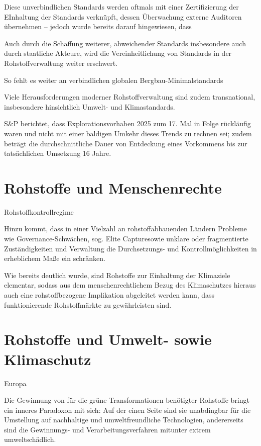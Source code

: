 \documentclass[12pt,a4paper,oneside]{book} %
\begin{document}
Diese unverbindlichen Standards werden oftmals mit einer Zertifizierung der EInhaltung der Standards verknüpft, dessen Überwachung externe Auditoren übernehmen -- jedoch wurde bereits darauf hingewiesen, dass 

Auch durch die Schaffung weiterer, abweichender Standards insbesondere auch durch staatliche Akteure, wird die Vereinheitlichung von Standards in der Rohstoffverwaltung weiter erschwert.

So fehlt es weiter an verbindlichen globalen Bergbau-Minimalstandards

Viele Herausforderungen moderner Rohstoffverwaltung sind zudem transnational, insbesondere hinsichtlich Umwelt- und Klimastandards.

S\&P berichtet, dass Explorationsvorhaben 2025 zum 17. Mal in Folge rückläufig waren und nicht mit einer baldigen Umkehr dieses Trends zu rechnen sei; zudem beträgt die durchschnittliche Dauer von Entdeckung eines Vorkommens bis zur tatsächlichen Umsetzung 16 Jahre.\autocite{S&P World Exploration Trends 2026}


\section{Rohstoffe und Menschenrechte}

Rohstoffkontrollregime

Hinzu kommt, dass in einer Vielzahl an rohstoffabbauenden Ländern Probleme wie Governance-Schwächen, sog. \glqq Elite Capture\grqq sowie unklare oder fragmentierte Zuständigkeiten und Verwaltung die Durchsetzungs- und Kontrollmöglichkeiten in erheblichem Maße ein schränken.\autocite{International Copper Study Group, Regulatory Survey 2026, S. 51.}

Wie bereits deutlich wurde, sind Rohstoffe zur Einhaltung der Klimaziele elementar, sodass aus dem menschenrechtlichem Bezug des Klimaschutzes hieraus auch eine rohstoffbezogene Implikation abgeleitet werden kann, dass funktionierende Rohstoffmärkte zu gewährleisten sind.\autocite{Frenz 2025, S. 1063}

\section{Rohstoffe und Umwelt- sowie Klimaschutz}

\glqq Europa

Die Gewinnung von für die grüne Transformationen benötigter Rohstoffe bringt ein inneres Paradoxon mit sich: Auf der einen Seite sind sie unabdingbar für die Umstellung auf nachhaltige und umweltfreundliche Technologien, andererseits sind die Gewinnungs- und Verarbeitungsverfahren mitunter extrem umweltschädlich.\autocite{https://www.actu-environnement.com/ae/news/interview-christian-hocquard-terres-rares-applications-environnementales-impact-chine-10352.php4} 
\end{document}
